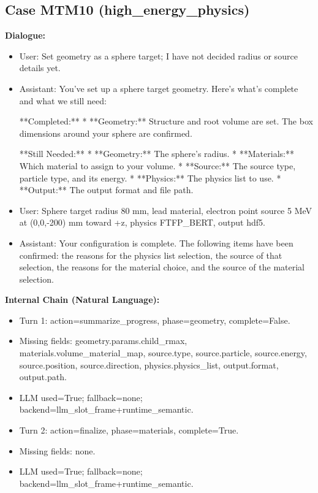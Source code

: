 \documentclass[11pt]{ctexart}
\begin{document}
\subsection{Case MTM10 (high\_energy\_physics)}
\textbf{Dialogue:}
\begin{itemize}
\item User: Set geometry as a sphere target; I have not decided radius or source details yet.
\item Assistant: You've set up a sphere target geometry. Here's what's complete and what we still need:

**Completed:**
*   **Geometry:** Structure and root volume are set. The box dimensions around your sphere are confirmed.

**Still Needed:**
*   **Geometry:** The sphere's radius.
*   **Materials:** Which material to assign to your volume.
*   **Source:** The source type, particle type, and its energy.
*   **Physics:** The physics list to use.
*   **Output:** The output format and file path.
\item User: Sphere target radius 80 mm, lead material, electron point source 5 MeV at (0,0,-200) mm toward +z, physics FTFP\_BERT, output hdf5.
\item Assistant: Your configuration is complete. The following items have been confirmed: the reasons for the physics list selection, the source of that selection, the reasons for the material choice, and the source of the material selection.
\end{itemize}
\textbf{Internal Chain (Natural Language):}
\begin{itemize}
\item Turn 1: action=summarize\_progress, phase=geometry, complete=False.
\item Missing fields: geometry.params.child\_rmax, materials.volume\_material\_map, source.type, source.particle, source.energy, source.position, source.direction, physics.physics\_list, output.format, output.path.
\item LLM used=True; fallback=none; backend=llm\_slot\_frame+runtime\_semantic.
\item Turn 2: action=finalize, phase=materials, complete=True.
\item Missing fields: none.
\item LLM used=True; fallback=none; backend=llm\_slot\_frame+runtime\_semantic.
\end{itemize}
\end{document}

